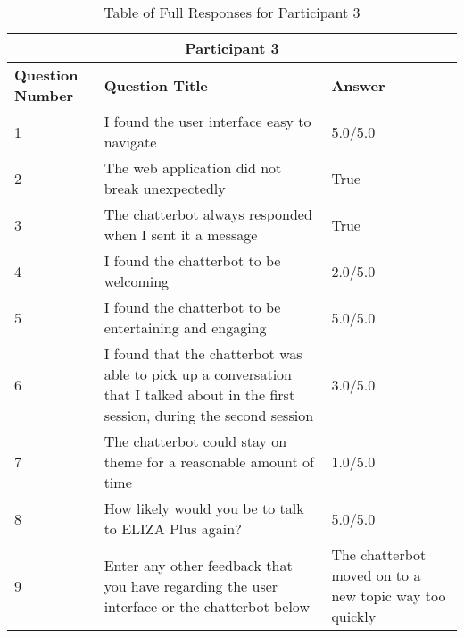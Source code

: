 \begin{table}[H]
	\centering
	\begin{tabular}{ |m{1.8cm}|m{6.5cm}| m{7cm}|} 
		\hline
		\multicolumn{3}{|c|}{Participant 3} \\
		\hline
		\textbf{Question Number} & \textbf{Question Title} & \textbf{Answer}\\ 
		\hline
		1 & I found the user interface easy to navigate & 5.0/5.0\\ 
		\hline
		2 & 
		The web application did not break unexpectedly & True \\ 
		\hline
		3 & The chatterbot always responded when I sent it a message & True\\
		\hline 
		4 & I found the chatterbot to be welcoming & 2.0/5.0\\
		\hline
		5 & I found the chatterbot to be entertaining and engaging & 5.0/5.0\\
		\hline
		6 & I found that the chatterbot was able to pick up a conversation that I talked about in the first session, during the second session  & 3.0/5.0\\
		\hline
		7 & The chatterbot could stay on theme for a reasonable amount of time & 1.0/5.0 \\
		\hline
		8 & 
		How likely would you be to talk to ELIZA Plus again? & 5.0/5.0\\
		\hline
		9 & 
		Enter any other feedback that you have regarding the user interface or the chatterbot below & The chatterbot moved on to a new topic way too quickly\\
		\hline
	\end{tabular}
	\caption{Table of Full Responses for Participant 3}
\end{table}

